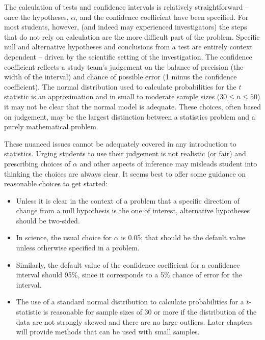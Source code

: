 \begin{spacing}{1.5}
The calculation of tests and confidence intervals is relatively straightforward -- once the hypotheses, $\alpha$, and the confidence coefficient have been specified.  For most students, however, (and indeed may experienced investigators) the steps that do not rely on calculation are the more difficult part of the problem.  Specific null and alternative hypotheses and conclusions from a test are entirely context dependent -- driven by the scientific setting of the investigation.  The confidence coefficient reflects a study team's judgement on the balance of precision (the width of the interval) and chance of possible error (1 minus the confidence coefficient). The normal distribution used to calculate probabilities for the $t$ statistic is an approximation and in small to moderate sample sizes ($30 \leq n \leq 50$) it may not be clear that the normal model is adequate.  These choices, often based on judgement, may be the largest distinction between a statistics problem and a purely mathematical problem.

These nuanced issues cannot be adequately covered in any introduction to statistics. Urging students to use their judgement is not realistic (or fair) and prescribing choices of $\alpha$ and other aspects of inference may misleads student into thinking the choices are always clear. It seems best to offer some guidance on reasonable choices to get started:

\begin{itemize}
	
	\item Unless it is clear in the context of a problem that a specific direction of change from a null hypothesis is the one of interest, alternative hypotheses should be two-sided.
	
	\item In science, the usual choice for $\alpha$ is 0.05; that should be the default value unless otherwise specified in a problem.
	
	\item Similarly, the default value of the confidence coefficient for a confidence interval should 95\%, since it corresponds to a 5\% chance of error for the interval.
	
	\item The use of a standard normal distribution to calculate probabilities for a $t$-statistic is reasonable for sample sizes of 30 or more if the distribution of the data are not strongly skewed and there are no large outliers.  Later chapters will provide methods that can be used with small samples.
	

\end{itemize}
\end{spacing}
